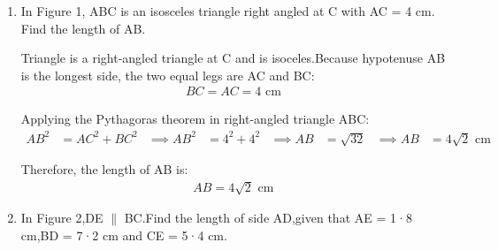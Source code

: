 \begin{enumerate}[label=\thesubsection.\arabic*, ref=\thesubsection.\theenumi]
   \item In Figure 1, ABC is an isosceles triangle right angled at C with
   AC = 4 cm. Find the length of AB.
   
   \begin{center}
   	\end{center}
   	
   	\solution
   	Triangle is a right-angled triangle at C and is isoceles.Because hypotenuse AB is the longest side, the two equal legs are AC and BC:
   	\begin{align*}
   		BC = AC = 4\text{ cm}
   	\end{align*}
   	
   	Applying the Pythagoras theorem in right-angled triangle ABC:
   	\begin{align*}
   		AB^2 &= AC^2 + BC^2 &\implies AB^2 &= 4^2 + 4^2 &\implies AB &= \sqrt{32} &\implies AB &= 4\sqrt{2}\text{ cm}
   	\end{align*}
   	
   	Therefore, the length of AB is:
   	\begin{align*}
   		AB = 4\sqrt{2}\text{ cm}
   	\end{align*}
   	
  
   	\item In Figure 2,DE $\parallel$ BC.Find the length of side AD,given that AE = 1·8 cm,BD = 7·2 cm and CE = 5·4 cm.
   	
\begin{center}
\end{center}
\end{enumerate}
